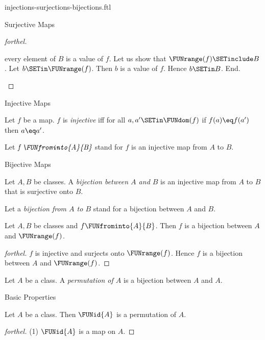 \documentclass{naproche-library}
\begin{document}
\begin{smodule}[title={Injective, Surjective and Bijective Maps}]{injections-surjections-bijections.ftl}
\begin{sfragment}{Surjective Maps}
\begin{proof}[forthel]
\begin{case}{every element of $B$ is a value of $f$.}
      Let us show that $\FUNrange(f) \SETinclude B$.
        Let $b \SETin \FUNrange(f)$.
        Then $b$ is a value of $f$.
        Hence $b \SETin B$.
      End.
    \end{case}
  \end{proof}
\end{sfragment}

\begin{sfragment}{Injective Maps}
  \begin{definition}[forthel,id=FOUNDATIONS_08_605931408719872]
    Let $f$ be a map.
    $f$ is \emph{injective} iff for all $a, a' \SETin \FUNdom(f)$ if $f(a) \eq f(a')$ then $a \eq a'$.

    Let $\emph{f \FUNfrominto{A}{B}}$ stand for $f$ is an injective map from $A$ to $B$.
  \end{definition}
\end{sfragment}

\begin{sfragment}{Bijective Maps}

  \begin{definition}[forthel,id=FOUNDATIONS_08_3356670992318464]
    Let $A, B$ be classes.
    A \emph{bijection between $A$ and $B$} is an injective map from $A$ to $B$ that is surjective onto $B$.

    Let a \emph{bijection from $A$ to $B$} stand for a bijection between $A$ and $B$.
  \end{definition}

  \begin{proposition}[forthel,id=FOUNDATIONS_08_60881194975232]
    Let $A, B$ be classes and $f \FUNfrominto{A}{B}$.
    Then $f$ is a bijection between $A$ and $\FUNrange(f)$.
  \end{proposition}
  \begin{proof}[forthel]
    $f$ is injective and surjects onto $\FUNrange(f)$.
    Hence $f$ is a bijection between $A$ and $\FUNrange(f)$.
  \end{proof}


  \begin{definition}[forthel,id=FOUNDATIONS_08_8188451318923264]
    Let $A$ be a class.
    A \emph{permutation of $A$} is a bijection between $A$ and $A$.
  \end{definition}
\end{sfragment}

\begin{sfragment}{Basic Properties}
  \begin{proposition}[forthel,id=FOUNDATIONS_08_7883784041005056]
    Let $A$ be a class.
    Then $\FUNid{A}$ is a permutation of $A$.
  \end{proposition}
  \begin{proof}[forthel]
    (1) $\FUNid{A}$ is a map on $A$.


\end{proof}
\end{sfragment}
\end{smodule}
\end{document}
